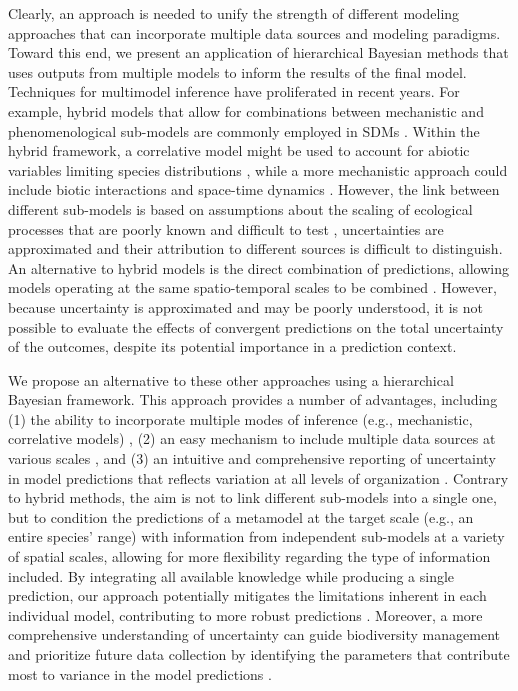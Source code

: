 \documentclass[11pt]{article}
\begin{document}
Clearly, an approach is needed to unify the strength of different modeling approaches that can incorporate multiple data sources and modeling paradigms.
Toward this end, we present an application of hierarchical Bayesian methods that uses outputs from multiple models to inform the results of the final model.
Techniques for multimodel inference have proliferated in recent years.
For example, hybrid models that allow for combinations between mechanistic and phenomenological sub-models are commonly employed in SDMs \citep{Gallien2010, Thuiller2013, Boulangeat2014}.
Within the hybrid framework, a correlative model might be used to account for abiotic variables limiting species distributions \citep{Guisan2005}, while a more mechanistic approach could include biotic interactions and space-time dynamics \citep{Smolik2010}.
However, the link between different sub-models is based on assumptions about the scaling of ecological processes that are poorly known and difficult to test \citep{Gallien2010}, uncertainties are approximated and their attribution to different sources is difficult to distinguish.
An alternative to hybrid models is the direct combination of predictions, allowing models operating at the same spatio-temporal scales to be combined \citep[e.g., model averaging, ensemble forecasting;][]{Araujo2007}. 
However, because uncertainty is approximated and may be poorly understood, it is not possible to evaluate the effects of convergent predictions on the total uncertainty of the outcomes, despite its potential importance in a prediction context.

We propose an alternative to these other approaches using a hierarchical Bayesian framework. 
This approach provides a number of advantages, including (1) the ability to incorporate multiple modes of inference (e.g., mechanistic, correlative models) \citep{VanOijen2005, Clark2006, Hobbs2011, Hartig2012}, (2) an easy mechanism to include multiple data sources at various scales \citep{Levin1992, Peters2004}, and (3) an intuitive and comprehensive reporting of uncertainty in model predictions that reflects variation at all levels of organization \citep{Cressie2009, Hobbs2011}.
Contrary to hybrid methods, the aim is not to link different sub-models into a single one, but to condition the predictions of a metamodel at the target scale (e.g., an entire species' range) with information from independent sub-models at a variety of spatial scales, allowing for more flexibility regarding the type of information included. 
By integrating all available knowledge while producing a single prediction, our approach potentially mitigates the limitations inherent in each individual model, contributing to more robust predictions \citep{Guisan2005, Araujo2006}.
Moreover, a more comprehensive understanding of uncertainty can guide biodiversity management and prioritize future data collection by identifying the parameters that contribute most to variance in the model predictions \citep{McMahon2011}. 
\end{document}
